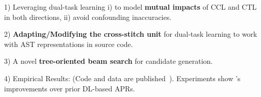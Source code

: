 

1) Leveraging dual-task learning i) to model {\bf mutual impacts}
of CCL and CTL in both directions, ii) avoid confounding inaccuracies.



2) {\bf Adapting/Modifying the cross-stitch unit} for dual-task
learning to work with AST representations in source code.

3) A novel {\bf tree-oriented beam search} for candidate generation.






4) Empirical Results: (Code and data are published~\cite{CDFix2022}).
Experiments show {\tool}'s improvements over prior
DL-based APRs.




